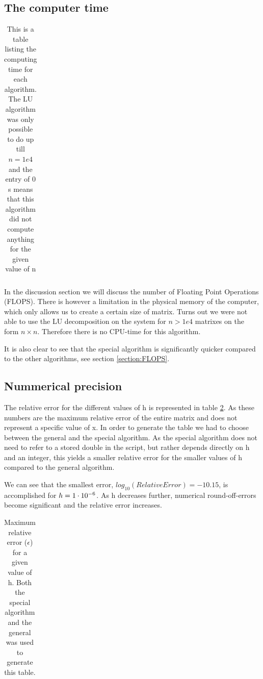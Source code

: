 \subsection{The computer time}


\begin{table}[H]\caption{This is a table listing the computing time for each algorithm. The LU algorithm was only possible to do up till $ n=1e4 $ and the entry of 0 s means that this algorithm did not compute anything for the given value of n}
	\label{tab:time}
	\begin{tabular}{cccc}
		
	\end{tabular}
\end{table}

In the discussion section we will discuss the number of Floating Point Operations (FLOPS). There is however a limitation in the physical memory of the computer, which only allows us to create a certain size of matrix. Turns out we were not able to use the LU decomposition on the system for $ n> 1e4 $ matrixes on the form  $ n\times n $. Therefore there is no CPU-time for this algorithm. 

It is also clear to see that the special algorithm is significantly quicker compared to the other algorithms, see section \ref{section:FLOPS}. 

\subsection{Nummerical precision}


The relative error for the different values of h is represented in table \ref{tab:error_developement}. As these numbers are the maximum relative error of the entire matrix and does not represent a specific value of x. In order to generate the table we had to choose between the general and the special algorithm. As the special algorithm does not need to refer to a stored double in the script, but rather depends directly on h and an integer, this yields a smaller relative error for the smaller values of h compared to the general algorithm. 

We can see that the smallest error, $log_{10}(RelativeError) = -10.15$, is accomplished for  $ h = 1\cdot 10^{-6} $. As h decreases further, numerical round-off-errors become significant and the relative error increases. 


\begin{table}[H]\caption{Maximum relative error ($ \epsilon $) for a given value of h. Both the special algorithm and the general was used to generate this table.} \label{tab:error_developement}
	\begin{tabular}{ccc}
		
	\end{tabular}
\end{table}

